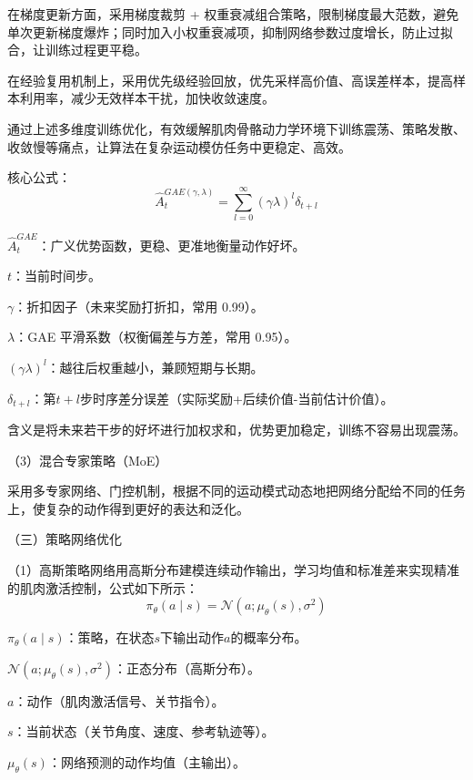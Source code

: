 在梯度更新方面，采用梯度裁剪 +
权重衰减组合策略，限制梯度最大范数，避免单次更新梯度爆炸；同时加入小权重衰减项，抑制网络参数过度增长，防止过拟合，让训练过程更平稳。

在经验复用机制上，采用优先级经验回放，优先采样高价值、高误差样本，提高样本利用率，减少无效样本干扰，加快收敛速度。

通过上述多维度训练优化，有效缓解肌肉骨骼动力学环境下训练震荡、策略发散、收敛慢等痛点，让算法在复杂运动模仿任务中更稳定、高效。

核心公式：
\begin{equation}
\widehat{A}_{t}^{GAE(\gamma,\lambda)}=\sum_{l=0}^{\infty}(\gamma\lambda)^l\delta_{t+l}
\tag{3-2}
\end{equation}

\({\widehat{A}}_{t}^{GAE}\)：广义优势函数，更稳、更准地衡量动作好坏。

$t$：当前时间步。

$\gamma$：折扣因子（未来奖励打折扣，常用 0.99）。

$\lambda$：GAE 平滑系数（权衡偏差与方差，常用 0.95）。

\((\gamma\lambda)^{l}\)：越往后权重越小，兼顾短期与长期。

\(\delta_{t + l}\)：第\(t + l\)步时序差分误差（实际奖励+后续价值-当前估计价值）。

含义是将未来若干步的好坏进行加权求和，优势更加稳定，训练不容易出现震荡。

（3）混合专家策略（MoE）

采用多专家网络、门控机制，根据不同的运动模式动态地把网络分配给不同的任务上，使复杂的动作得到更好的表达和泛化。

（三）策略网络优化

（1）高斯策略网络用高斯分布建模连续动作输出，学习均值和标准差来实现精准的肌肉激活控制，公式如下所示：
\begin{equation}
\pi_{\theta}(a\mid s)=\mathcal{N}\left(a;\mu_{\theta}(s),\sigma^2\right)
\tag{3-3}
\end{equation}

\(\pi_{\theta}(a \mid s)\)：策略，在状态\(s\)下输出动作\(a\)的概率分布。

\(\mathcal{N}\left( a;\mu_{\theta}(s),\sigma^{2} \right)\)：正态分布（高斯分布）。

\(a\)：动作（肌肉激活信号、关节指令）。

\(s\)：当前状态（关节角度、速度、参考轨迹等）。

\(\mu_{\theta}(s)\)：网络预测的动作均值（主输出）。

